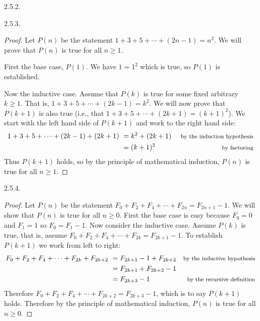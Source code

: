 \begin {itemize}
\begin{ans}{2.5.2.}
\end{ans}
\begin{ans}{2.5.3.}
		\begin{proof}
		 Let $P(n)$ be the statement $1+3 +5 + \cdots + (2n-1) = n^2$.  We will prove that $P(n)$ is true for all $n \ge 1$.

		 First the base case, $P(1)$.  We have $ 1 = 1^2$ which is true, so $P(1)$ is established.

		 Now the inductive case.  Assume that $P(k)$ is true for some fixed arbitrary $k \ge 1$.  That is, $1 + 3 + 5 + \cdots + (2k-1) = k^2$.  We will now prove that $P(k+1)$ is also true (i.e., that $1 + 3 + 5 + \cdots + (2k+1) = (k+1)^2$).  We start with the left hand side of $P(k+1)$ and work to the right hand side:
		 \begin{align*}
		  1 + 3 + 5 + \cdots + (2k-1) + (2k+1) ~ & = k^2 + (2k+1) & \mbox{ \footnotesize by the induction hypothesis}\\
		  & = (k+1)^2 & \mbox{ \footnotesize by factoring}
		 \end{align*}
		Thus $P(k+1)$ holds, so by the principle of mathematical induction, $P(n)$ is true for all $n \ge 1$.
		\end{proof}
	
\end{ans}
\begin{ans}{2.5.4.}
		\begin{proof}
		 Let $P(n)$ be the statement $F_0 + F_2 + F_4 + \cdots + F_{2n} = F_{2n+1} - 1$.  We will show that $P(n)$ is true for all $n \ge 0$.  First the base case is easy because $F_0 = 0$ and $F_1 = 1$ so $F_0 = F_1 - 1$.  Now consider the inductive case.  Assume $P(k)$ is true, that is, assume $F_0 + F_2 + F_4 + \cdots + F_{2k} = F_{2k+1} - 1$.  To establish $P(k+1)$ we work from left to right:
		 \begin{align*}
		  F_0 + F_2 + F_4 + \cdots + F_{2k} + F_{2k+2} ~ & = F_{2k+1} - 1 + F_{2k+2} & \mbox{\footnotesize by the inductive hypothesis}\\
		  & = F_{2k+1} + F_{2k+2} - 1 & \\
		  & = F_{2k+3} - 1 & \mbox{\footnotesize by the recursive definition}
		 \end{align*}
		Therefore $F_0 + F_2 + F_4 + \cdots + F_{2k+2} = F_{2k+3} - 1$, which is to say $P(k+1)$ holds.  Therefore by the principle of mathematical induction, $P(n)$ is true for all $n \ge 0$.
		\end{proof}
	

\end{ans}
\end{itemize}
